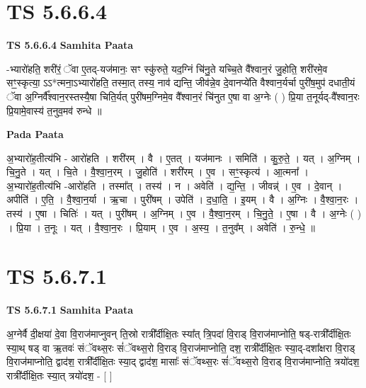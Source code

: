 \documentclass[17pt]{extarticle}
\begin{document}

\section{ TS 5.6.6.4 }

\textbf{TS 5.6.6.4 } \newline
\textbf{Samhita Paata} \newline

-भ्यारो॑हति॒ शरी॑रं॒ ॅवा ए॒तद्-यज॑मानः॒ सꣳ स्कु॑रुते॒ यद॒ग्निं चि॑नु॒ते यच्चि॒ते वै᳚श्वान॒रं जु॒होति॒ शरी॑रमे॒व सꣳ॒॒स्कृत्या॒ ऽऽ*त्मना॒ऽभ्यारो॑हति॒ तस्मा॒त् तस्य॒ नाव॑ द्यन्ति॒ जीव॑न्ने॒व दे॒वानप्ये॑ति वैश्वान॒र्यर्चा पुरी॑ष॒मुप॑ दधाती॒यं ॅवा अ॒ग्निर्वै᳚श्वान॒रस्तस्यै॒षा चिति॒र्यत् पुरी॑षम॒ग्निमे॒व वै᳚श्वान॒रं चि॑नुत ए॒षा वा अ॒ग्नेः ( ) प्रि॒या त॒नूर्यद्-वै᳚श्वान॒रः प्रि॒यामे॒वास्य॑ त॒नुव॒मव॑ रुन्धे ॥ \newline

\textbf{Pada Paata} \newline

अ॒भ्यारो॑ह॒तीत्य॑भि - आरो॑हति । शरी॑रम् । वै । ए॒तत् । यज॑मानः । समिति॑ । कु॒रु॒ते॒ । यत् । अ॒ग्निम् । चि॒नु॒ते । यत् । चि॒ते । वै॒श्वा॒न॒रम् । जु॒होति॑ । शरी॑रम् । ए॒व । सꣳ॒॒स्कृत्य॑ । आ॒त्मना᳚ । अ॒भ्यारो॑ह॒तीत्य॑भि -आरो॑हति । तस्मा᳚त् । तस्य॑ । न । अवेति॑ । द्य॒न्ति॒ । जीवन्न्॑ । ए॒व । दे॒वान् । अपीति॑ । ए॒ति॒ । वै॒श्वा॒न॒र्या । ऋ॒चा । पुरी॑षम् । उपेति॑ । द॒धा॒ति॒ । इ॒यम् । वै । अ॒ग्निः । वै॒श्वा॒न॒रः । तस्य॑ । ए॒षा । चितिः॑ । यत् । पुरी॑षम् । अ॒ग्निम् । ए॒व । वै॒श्वा॒न॒रम् । चि॒नु॒ते॒ । ए॒षा । वै । अ॒ग्नेः ( ) । प्रि॒या । त॒नूः । यत् । वै॒श्वा॒न॒रः । प्रि॒याम् । ए॒व । अ॒स्य॒ । त॒नुव᳚म् । अवेति॑ । रु॒न्धे॒ ॥  \newline





\section{ TS 5.6.7.1 }

\textbf{TS 5.6.7.1 } \newline
\textbf{Samhita Paata} \newline

अ॒ग्नेर्वै दी॒क्षया॑ दे॒वा वि॒राज॑माप्नुवन् ति॒स्रो रात्री᳚र्दीक्षि॒तः स्या᳚त् त्रि॒पदा॑ वि॒राड् वि॒राज॑माप्नोति॒ षड्-रात्री᳚र्दीक्षि॒तः स्या॒थ् षड् वा ऋ॒तवः॑ संॅवथ्स॒रः सं॑ॅवथ्स॒रो वि॒राड् वि॒राज॑माप्नोति॒ दश॒ रात्री᳚र्दीक्षि॒तः स्या॒द्-दशा᳚क्षरा वि॒राड् वि॒राज॑माप्नोति॒ द्वाद॑श॒ रात्री᳚र्दीक्षि॒तः स्या॒द् द्वाद॑श॒ मासाः᳚ संॅवथ्स॒रः सं॑ॅवथ्स॒रो वि॒राड् वि॒राज॑माप्नोति॒ त्रयो॑दश॒ रात्री᳚र्दीक्षि॒तः स्या॒त् त्रयो॑दश॒ - [  ] \newline
\end{document}
